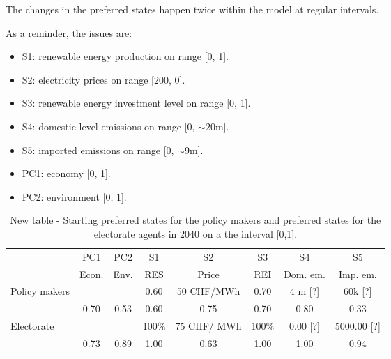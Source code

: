 \documentclass[12pt]{article}
\begin{document}
The changes in the preferred states happen twice within the model at regular intervals.

As a reminder, the issues are: 

\begin{itemize}
\item S1: renewable energy production on range [0, 1].
\item S2: electricity prices on range [200, 0]. %
\item S3: renewable energy investment level on range [0, 1].
\item S4: domestic level emissions on range [0, $\sim$20m].
\item S5: imported emissions on range [0, $\sim$9m]. %
\item PC1: economy [0, 1]. %
\item PC2: environment [0, 1]. %
\end{itemize}

\begin{table}
\begin{center}
\begin{tabular}{|l|c|c|c|c|c|c|c|} 
\hline
		& PC1		& PC2	&  S1	& S2			& S3		& S4			& S5			\\ 
		& Econ.		& Env.	& RES	& Price		& REI	& Dom. em.	& Imp. em.	\\ \hline
\multirow{2}{*}{Policy makers}
		& 			&		& 0.60	& 50 CHF/MWh	& 0.70	& 4 m [?]		& 60k [?]		\\ \cline{2-8}
		& 0.70		& 0.53	& 0.60	& 0.75		& 0.70	& 0.80		& 0.33		\\ \hline
\multirow{2}{*}{Electorate}
		&			&		&100\%	& 75 CHF/	MWh	& 100\%	& 0.00 [?]		& 5000.00	 [?]	\\ \cline{2-8}
		& 0.73		& 0.89	&1.00	& 0.63		& 1.00	& 1.00		& 0.94	 	\\ \hline
\end{tabular}
\end{center}
\caption{New table - Starting preferred states for the policy makers and preferred states for the electorate agents in 2040 on a the interval [0,1].}
\label{tab:}
\end{table}

\end{document}

